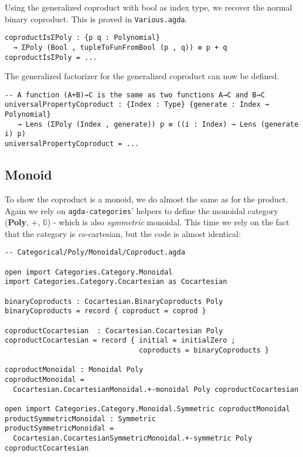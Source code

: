 Using the generalized coproduct with bool as index type, we recover the normal binary coproduct. This is proved in \texttt{Various.agda}.

\begin{verbatim}
coproductIsΣPoly : {p q : Polynomial}
  → ΣPoly (Bool , tupleToFunFromBool (p , q)) ≡ p + q
coproductIsΣPoly = ...
\end{verbatim}

The generalized factorizer for the generalized coproduct can now be defined.

\begin{verbatim}
-- A function (A+B)→C is the same as two functions A→C and B→C
universalPropertyCoproduct : {Index : Type} {generate : Index → Polynomial}
   → Lens (ΣPoly (Index , generate)) p ≡ ((i : Index) → Lens (generate i) p)
universalPropertyCoproduct = ...
\end{verbatim}

\subsection{Monoid}
To show the coproduct is a monoid, we do almost the same as for the product. Again we rely on \texttt{agda-categories}' helpers to define the monoidal category (\textbf{Poly}, $+$, $\mathbb{0}$) - which is also \textit{symmetric} monoidal. This time we rely on the fact that the category is \textit{co-}cartesian, but the code is almost identical:
\begin{verbatim}
-- Categorical/Poly/Monoidal/Coproduct.agda

open import Categories.Category.Monoidal
import Categories.Category.Cocartesian as Cocartesian

binaryCoproducts : Cocartesian.BinaryCoproducts Poly
binaryCoproducts = record { coproduct = coprod }

coproductCocartesian  : Cocartesian.Cocartesian Poly
coproductCocartesian = record { initial = initialZero ;
                                coproducts = binaryCoproducts }

coproductMonoidal : Monoidal Poly
coproductMonoidal = 
  Cocartesian.CocartesianMonoidal.+-monoidal Poly coproductCocartesian

open import Categories.Category.Monoidal.Symmetric coproductMonoidal
productSymmetricMonoidal : Symmetric
productSymmetricMonoidal = 
  Cocartesian.CocartesianSymmetricMonoidal.+-symmetric Poly coproductCocartesian
\end{verbatim}

